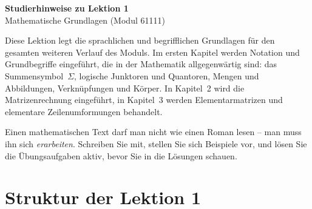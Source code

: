 \documentclass[a4paper,12pt]{article}
\begin{document}
\begin{center}
  {\LARGE\bfseries Studierhinweise zu Lektion 1}\\[0.5em]
  {\large Mathematische Grundlagen (Modul 61111)}
\end{center}

\vspace{1em}

Diese Lektion legt die sprachlichen und begrifflichen Grundlagen für den gesamten
weiteren Verlauf des Moduls. Im ersten Kapitel werden Notation und Grundbegriffe
eingeführt, die in der Mathematik allgegenwärtig sind: das Summensymbol~$\Sigma$,
logische Junktoren und Quantoren, Mengen und Abbildungen, Verknüpfungen und
Körper. In Kapitel~2 wird die Matrizenrechnung eingeführt, in Kapitel~3 werden
Elementarmatrizen und elementare Zeilenumformungen behandelt.

Einen mathematischen Text darf man nicht wie einen Roman lesen -- man muss ihn
sich \emph{erarbeiten}. Schreiben Sie mit, stellen Sie sich Beispiele vor, und lösen
Sie die Übungsaufgaben aktiv, bevor Sie in die Lösungen schauen.

\section*{Struktur der Lektion 1}
\end{document}

